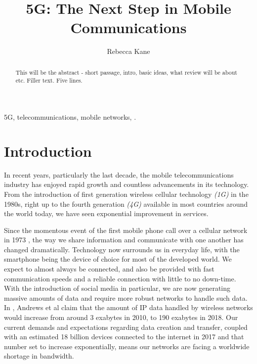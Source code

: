 \documentclass[journal]{IEEEtran}
\begin{document}
\title{5G: The Next Step in Mobile Communications}
\author{Rebecca Kane}


\maketitle

\begin{abstract}
This will be the abstract - short passage, intro, basic ideas, what review will be about etc. Filler text. Five lines.
\end{abstract}
\begin{IEEEkeywords}
5G, telecommunications, mobile networks, .
\end{IEEEkeywords}

\section{Introduction}
In recent years, particularly the last decade, the mobile telecommunications industry has enjoyed rapid growth and countless advancements in its technology. From the introduction of first generation wireless cellular technology \textit{(1G)} in the 1980s, right up to the fourth generation \textit{(4G)} available in most countries around the world today, we have seen exponential improvement in services.

Since the momentous event of the first mobile phone call over a cellular network in 1973 \cite{tomfarhist}, the way we share information and communicate with one another has changed dramatically. Technology now surrounds us in everyday life, with the smartphone being the device of choice for most of the developed world. We expect to almost always be connected, and also be provided with fast communication speeds and a reliable connection with little to no down-time. With the introduction of social media in particular, we are now generating massive amounts of data and require more robust networks to handle such data. In \cite{whatwill5gbe}, Andrews et al claim that the amount of IP data handled by wireless networks would increase from around 3 exabytes in 2010, to 190 exabytes in 2018. Our current demands and expectations regarding data creation and transfer, coupled with an estimated 18 billion devices connected to the internet in 2017 \cite{ericssondev} and that number set to increase exponentially, means our networks are facing a worldwide shortage in bandwidth.
\end{document}
